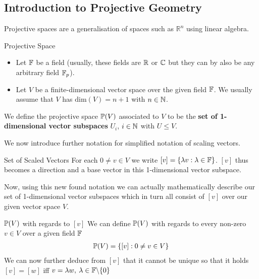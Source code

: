 \subsection{Introduction to Projective Geometry}

Projective spaces are a generalisation of spaces such as $\mathbb{R}^n$ using linear algebra. \\




\begin{definitionBox}{Projective Space}    
    \begin{itemize}
        \item Let $\mathbb{F}$ be a field (usually, these fields are $\mathbb{R}$ or $\mathbb{C}$ but they can by also be any arbitrary field $\mathbb{F}_p$).
        \item Let $V$ be a finite-dimensional vector space over the given field $\mathbb{F}$. We usually assume that $V$ has $\mathrm{dim}(V) = n +1$ with $n \in \mathbb{N}$.
    \end{itemize}  

    We define the projective space $\mathbb{P}(V)$ associated to $V$ to be the \textbf{set of 1-dimensional vector subspaces} $U_i$, $i \in \mathbb{N}$ with $U \leq V$.
\end{definitionBox}
\vspace{0.5cm}



We now introduce further notation for simplified notation of scaling vectors.

\begin{definitionBox}{Set of Scaled Vectors}
    For each $0 \neq v \in V$ we write $[v] = \{\lambda v: \lambda \in \mathbb{F}\}$.
    $[v]$ thus becomes a direction and a base vector in this 1-dimensional vector subspace.
\end{definitionBox}
\vspace{0.5cm}



Now, using this new found notation we can actually mathematically describe our set of 1-dimensional vector subspaces which in turn all consist of $[v]$ over our given vector space $V$.

\begin{definitionBox}{$\mathbb{P}(V)$ with regards to $[v]$}
    We can define $\mathbb{P}(V)$ with regards to every non-zero $v \in V$ over a given field $\mathbb{F}$
    \begin{gather*}
        \mathbb{P}(V) = \{[v]: 0 \neq v \in V\}
    \end{gather*}
    We can now further deduce from $[v]$ that it cannot be unique so that it holds $[v] = [w]$ iff $v = \lambda w, \: \lambda \in \mathbb{F} \backslash \{0\}$
\end{definitionBox}

